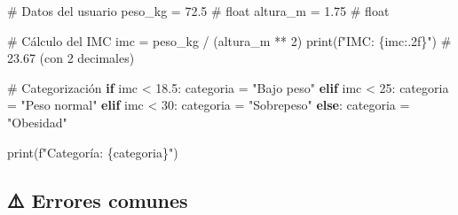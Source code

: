 \documentclass[
  doc,
  floatsintext,
  longtable,
  a4paper,
  nolmodern,
  notxfonts,
  notimes,
  12pt,
  colorlinks=true,linkcolor=blue,citecolor=blue,urlcolor=blue]{apa7}
\newenvironment{Shaded}{\begin{snugshade}}{\end{snugshade}}
\newcommand{\BuiltInTok}[1]{\textcolor[rgb]{0.00,0.23,0.31}{#1}}
\newcommand{\CommentTok}[1]{\textcolor[rgb]{0.37,0.37,0.37}{#1}}
\newcommand{\ControlFlowTok}[1]{\textcolor[rgb]{0.00,0.23,0.31}{\textbf{#1}}}
\newcommand{\DecValTok}[1]{\textcolor[rgb]{0.68,0.00,0.00}{#1}}
\newcommand{\FloatTok}[1]{\textcolor[rgb]{0.68,0.00,0.00}{#1}}
\newcommand{\NormalTok}[1]{\textcolor[rgb]{0.00,0.23,0.31}{#1}}
\newcommand{\OperatorTok}[1]{\textcolor[rgb]{0.37,0.37,0.37}{#1}}
\newcommand{\SpecialCharTok}[1]{\textcolor[rgb]{0.37,0.37,0.37}{#1}}
\newcommand{\SpecialStringTok}[1]{\textcolor[rgb]{0.13,0.47,0.30}{#1}}
\newcommand{\StringTok}[1]{\textcolor[rgb]{0.13,0.47,0.30}{#1}}
\begin{document}
\begin{Shaded}
\begin{Highlighting}[]
\CommentTok{\# Datos del usuario}
\NormalTok{peso\_kg }\OperatorTok{=} \FloatTok{72.5}    \CommentTok{\# float}
\NormalTok{altura\_m }\OperatorTok{=} \FloatTok{1.75}   \CommentTok{\# float}

\CommentTok{\# Cálculo del IMC}
\NormalTok{imc }\OperatorTok{=}\NormalTok{ peso\_kg }\OperatorTok{/}\NormalTok{ (altura\_m }\OperatorTok{**} \DecValTok{2}\NormalTok{)}
\BuiltInTok{print}\NormalTok{(}\SpecialStringTok{f"IMC: }\SpecialCharTok{\{}\NormalTok{imc}\SpecialCharTok{:.2f\}}\SpecialStringTok{"}\NormalTok{)  }\CommentTok{\# 23.67 (con 2 decimales)}

\CommentTok{\# Categorización}
\ControlFlowTok{if}\NormalTok{ imc }\OperatorTok{\textless{}} \FloatTok{18.5}\NormalTok{:}
\NormalTok{    categoria }\OperatorTok{=} \StringTok{"Bajo peso"}
\ControlFlowTok{elif}\NormalTok{ imc }\OperatorTok{\textless{}} \DecValTok{25}\NormalTok{:}
\NormalTok{    categoria }\OperatorTok{=} \StringTok{"Peso normal"}
\ControlFlowTok{elif}\NormalTok{ imc }\OperatorTok{\textless{}} \DecValTok{30}\NormalTok{:}
\NormalTok{    categoria }\OperatorTok{=} \StringTok{"Sobrepeso"}
\ControlFlowTok{else}\NormalTok{:}
\NormalTok{    categoria }\OperatorTok{=} \StringTok{"Obesidad"}

\BuiltInTok{print}\NormalTok{(}\SpecialStringTok{f"Categoría: }\SpecialCharTok{\{}\NormalTok{categoria}\SpecialCharTok{\}}\SpecialStringTok{"}\NormalTok{)}
\end{Highlighting}
\end{Shaded}

\subsection{⚠️ Errores comunes}\label{errores-comunes}
\end{document}
